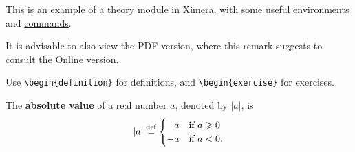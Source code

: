 \documentclass{ximera}
\begin{document}
    \author{Wim Obbels}
    \label{xim:ximeraDemo}

This is an example of a theory module in Ximera, 
with some useful \hyperref[xim:ximeraEnvironments]{environments} and \hyperref[xim:ximeraCommands]{commands}.

\begin{onlineOnly}
 \begin{remark}
    It is advisable to also view the PDF version, where this remark suggests to consult the Online version.
 \end{remark}
\end{onlineOnly}

Use \verb|\begin{definition}| for definitions, and \verb|\begin{exercise}| for exercises.

\begin{definition}\label{showcase:absolutevalue}
	The \textbf{absolute value} of a real number $a$, denoted by $|a|$, is
	\[
		|a| \overset{\mathrm{def}}{=} \begin{cases}
				        \phantom{-}a  & \text{if } a \geqslant 0 \\
				                  -a  & \text{if } a<0.
			        \end{cases}
	\]
\end{definition}
\end{document}

